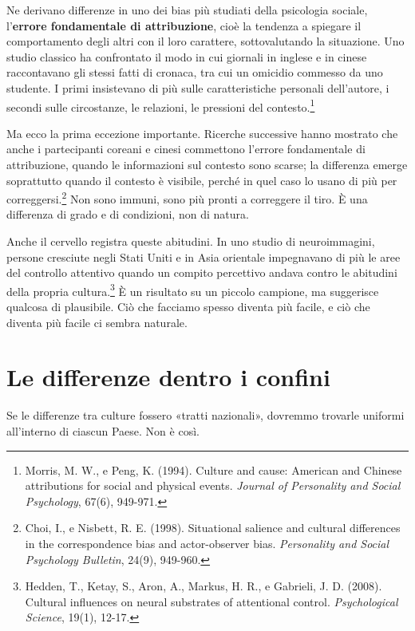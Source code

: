 Ne derivano differenze in uno dei bias più studiati della psicologia sociale, l'\textbf{errore fondamentale di attribuzione}, cioè la tendenza a spiegare il comportamento degli altri con il loro carattere, sottovalutando la situazione. Uno studio classico ha confrontato il modo in cui giornali in inglese e in cinese raccontavano gli stessi fatti di cronaca, tra cui un omicidio commesso da uno studente. I primi insistevano di più sulle caratteristiche personali dell'autore, i secondi sulle circostanze, le relazioni, le pressioni del contesto.\footnote{Morris, M. W., e Peng, K. (1994). Culture and cause: American and Chinese attributions for social and physical events. \textit{Journal of Personality and Social Psychology}, 67(6), 949-971.}

Ma ecco la prima eccezione importante. Ricerche successive hanno mostrato che anche i partecipanti coreani e cinesi commettono l'errore fondamentale di attribuzione, quando le informazioni sul contesto sono scarse; la differenza emerge soprattutto quando il contesto è visibile, perché in quel caso lo usano di più per correggersi.\footnote{Choi, I., e Nisbett, R. E. (1998). Situational salience and cultural differences in the correspondence bias and actor-observer bias. \textit{Personality and Social Psychology Bulletin}, 24(9), 949-960.} Non sono immuni, sono più pronti a correggere il tiro. È una differenza di grado e di condizioni, non di natura.

Anche il cervello registra queste abitudini. In uno studio di neuroimmagini, persone cresciute negli Stati Uniti e in Asia orientale impegnavano di più le aree del controllo attentivo quando un compito percettivo andava contro le abitudini della propria cultura.\footnote{Hedden, T., Ketay, S., Aron, A., Markus, H. R., e Gabrieli, J. D. (2008). Cultural influences on neural substrates of attentional control. \textit{Psychological Science}, 19(1), 12-17.} È un risultato su un piccolo campione, ma suggerisce qualcosa di plausibile. Ciò che facciamo spesso diventa più facile, e ciò che diventa più facile ci sembra naturale.

\section{Le differenze dentro i confini}

Se le differenze tra culture fossero «tratti nazionali», dovremmo trovarle uniformi all'interno di ciascun Paese. Non è così.

